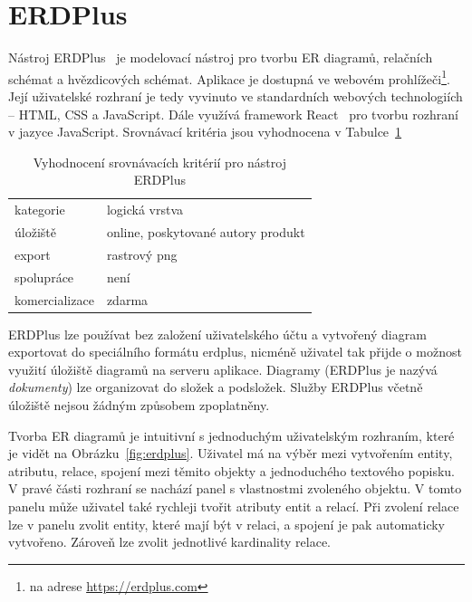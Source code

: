 \section{ERDPlus}

Nástroj ERDPlus~\cite{erdplus_2023} je modelovací nástroj pro tvorbu ER diagramů, relačních schémat a hvězdicových schémat.
Aplikace je dostupná ve webovém prohlížeči\footnote{na adrese \url{https://erdplus.com}}.
Její uživatelské rozhraní je tedy vyvinuto ve standardních webových technologiích -- HTML, CSS a JavaScript.
Dále využívá framework React~\cite{react_2023} pro tvorbu rozhraní v jazyce JavaScript.
Srovnávací kritéria jsou vyhodnocena v Tabulce~\ref{tab:comparison-erdplus}

\begin{table}[!htb]
  \begin{tabularx}{\textwidth}{lX}\toprule
    kategorie      & logická vrstva                     \\
    úložiště       & online, poskytované autory produkt \\
    export         & rastrový \acrshort{png}            \\
    spolupráce     & není                               \\
    komercializace & zdarma
    \\\bottomrule
  \end{tabularx}
  \caption{Vyhodnocení srovnávacích kritérií pro nástroj ERDPlus}
  \label{tab:comparison-erdplus}
\end{table}

ERDPlus lze používat bez založení uživatelského účtu a vytvořený diagram exportovat do speciálního formátu erdplus, nicméně uživatel tak přijde o možnost využití úložiště diagramů na serveru aplikace.
Diagramy (ERDPlus je nazývá \emph{dokumenty}) lze organizovat do složek a podsložek.
Služby ERDPlus včetně úložiště nejsou žádným způsobem zpoplatněny.

Tvorba ER diagramů je intuitivní s jednoduchým uživatelským rozhraním, které je vidět na Obrázku~\ref{fig:erdplus}.
Uživatel má na výběr mezi vytvořením entity, atributu, relace, spojení mezi těmito objekty a jednoduchého textového popisku.
V pravé části rozhraní se nachází panel s vlastnostmi zvoleného objektu.
V tomto panelu může uživatel také rychleji tvořit atributy entit a relací.
Při zvolení relace lze v panelu zvolit entity, které mají být v relaci, a spojení je pak automaticky vytvořeno.
Zároveň lze zvolit jednotlivé kardinality relace.

